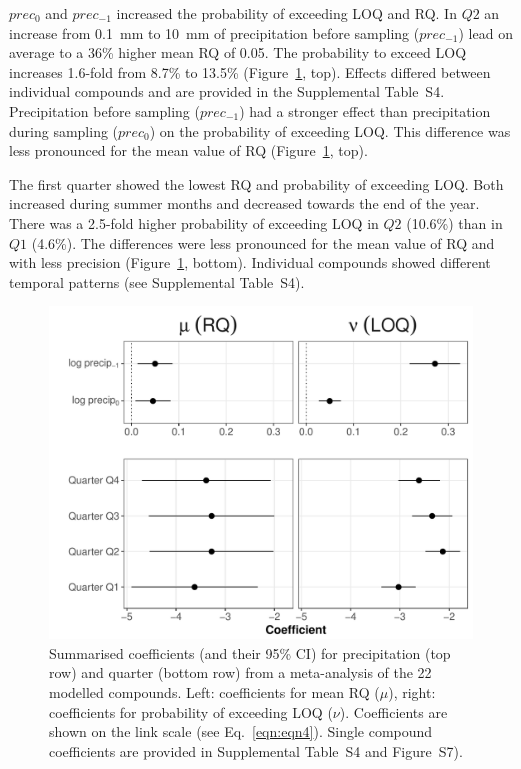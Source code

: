 $prec_{0}$ and $prec_{-1}$ increased the probability of exceeding LOQ and RQ.
In $Q2$ an increase from 0.1~mm to 10~mm of precipitation before sampling ($prec_{-1}$) lead on average to a 36\% higher mean RQ of 0.05.
The probability to exceed LOQ increases 1.6-fold from 8.7\% to 13.5\% (Figure~\ref{fig:ss:fig5}, top). %
Effects differed between individual compounds and are provided in the Supplemental Table~S4. 
Precipitation before sampling ($prec_{-1}$) had a stronger effect than precipitation during sampling ($prec_{0}$) on the probability of exceeding LOQ. 
This difference was less pronounced for the mean value of RQ (Figure~\ref{fig:ss:fig5}, top). 

The first quarter showed the lowest RQ and probability of exceeding LOQ.
Both increased during summer months and decreased towards the end of the year.
There was a 2.5-fold higher probability of exceeding LOQ in $Q2$ (10.6\%) than in $Q1$ (4.6\%).
The differences were less pronounced for the mean value of RQ and with less precision (Figure~\ref{fig:ss:fig5}, bottom). 
Individual compounds showed different temporal patterns (see Supplemental Table~S4). 


\begin{figure}[ht]
  \includegraphics[width=\textwidth]{chapters/smallstreams/figure5.pdf}
  \caption[Summarised coefficients (and their 95\% CI) for precipitation (top row) and quarter (bottom row) from a meta-analysis of the 22 modelled compounds.]{Summarised coefficients (and their 95\% CI) for precipitation (top row) and quarter (bottom row) from a meta-analysis of the 22 modelled compounds. Left: coefficients for mean RQ ($\mu$), right: coefficients for probability of exceeding LOQ ($\nu$). 
  Coefficients are shown on the link scale (see Eq.~\ref{eqn:eqn4}).
  Single compound coefficients are provided in Supplemental Table~S4 and Figure~S7).
  }
  \label{fig:ss:fig5}
\end{figure}


